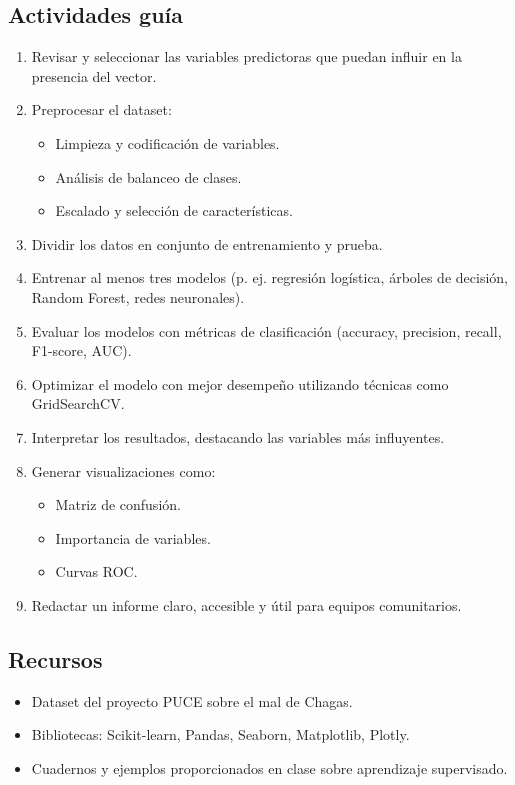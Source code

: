 \documentclass[a4,11pt]{aleph-notas}
\begin{document}
\subsection*{Actividades guía}
\begin{enumerate}[leftmargin=*, label={{\arabic*.}}]
    \item Revisar y seleccionar las variables predictoras que puedan influir en la presencia del vector.
    \item Preprocesar el dataset:
        \begin{itemize}
            \item Limpieza y codificación de variables.
            \item Análisis de balanceo de clases.
            \item Escalado y selección de características.
        \end{itemize}
    \item Dividir los datos en conjunto de entrenamiento y prueba.
    \item Entrenar al menos tres modelos (p. ej. regresión logística, árboles de decisión, Random Forest, redes neuronales).
    \item Evaluar los modelos con métricas de clasificación (accuracy, precision, recall, F1-score, AUC).
    \item Optimizar el modelo con mejor desempeño utilizando técnicas como GridSearchCV.
    \item Interpretar los resultados, destacando las variables más influyentes.
    \item Generar visualizaciones como:
        \begin{itemize}
            \item Matriz de confusión.
            \item Importancia de variables.
            \item Curvas ROC.
        \end{itemize}
    \item Redactar un informe claro, accesible y útil para equipos comunitarios.
\end{enumerate}

\subsection*{Recursos}
\begin{itemize}[leftmargin=*]
    \item Dataset del proyecto PUCE sobre el mal de Chagas.
    \item Bibliotecas: Scikit-learn, Pandas, Seaborn, Matplotlib, Plotly.
    \item Cuadernos y ejemplos proporcionados en clase sobre aprendizaje supervisado.
\end{itemize}
\end{document}
